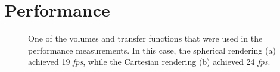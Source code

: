 \documentclass{egpubl}
\begin{document}
\section{Performance}
\label{sec:performance}
\begin{figure}
	\centering
	\caption{One of the volumes and transfer functions that were used in the performance measurements. In this case, the spherical rendering (a) achieved 19 \emph{fps}, while the Cartesian rendering (b) achieved 24 \emph{fps}.}
	\label{fig:performance}
\end{figure}
\end{document}
